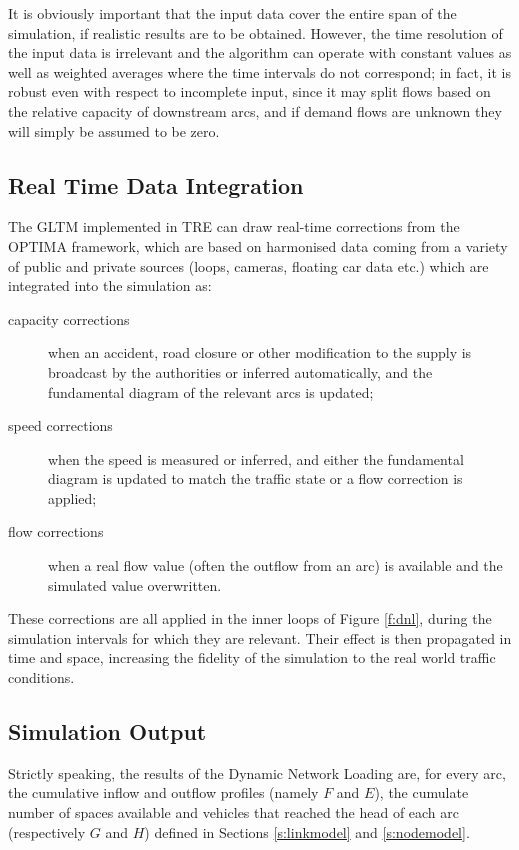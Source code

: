 It is obviously important that the input data cover the entire span of the simulation, if realistic results are to be obtained.
However, the time resolution of the input data is irrelevant and the algorithm can operate with constant values as well as weighted averages where the time intervals do not correspond; in fact, it is robust even with respect to incomplete input, since it may split flows based on the relative capacity of downstream arcs, and if demand flows are unknown they will simply be assumed to be zero.


\subsection{Real Time Data Integration}
The GLTM implemented in TRE can draw real-time corrections from the OPTIMA framework, which are based on harmonised data coming from a variety of public and private sources (loops, cameras, floating car data etc.) which are integrated into the simulation as:
\begin{description}
\item[capacity corrections] when an accident, road closure or other modification to the supply is broadcast by the authorities or inferred automatically, and the fundamental diagram of the relevant arcs is updated;
\item[speed corrections] when the speed is measured or inferred, and either the fundamental diagram is updated to match the traffic state or a flow correction is applied;
\item[flow corrections] when a real flow value (often the outflow from an arc) is available and the simulated value overwritten.
\end{description}


These corrections are all applied in the inner loops of Figure \ref{f:dnl}, during the simulation intervals for which they are relevant. Their effect is then propagated in time and space, increasing the fidelity of the simulation to the real world traffic conditions.


\subsection{Simulation Output} \label{s:output}
Strictly speaking, the results of the Dynamic Network Loading are, for every arc, the cumulative inflow and outflow profiles (namely $F$ and $E$), the cumulate number of spaces available and vehicles that reached the head of each arc (respectively $G$ and $H$) defined in Sections \ref{s:linkmodel} and \ref{s:nodemodel}.

